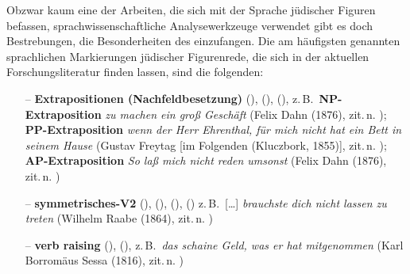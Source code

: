 Obzwar kaum eine der Arbeiten, die sich mit der Sprache jüdischer Figuren befassen, sprachwissenschaftliche Analysewerkzeuge verwendet gibt es doch Bestrebungen, die Besonderheiten des \hai{{\LiJi}} einzufangen. Die am häufigsten genannten sprachlichen Markierungen jüdischer Figurenrede, die sich in der aktuellen Forschungsliteratur finden lassen, sind die folgenden:

\newpage 

\begin{itemize}

\item [–] \textbf{Extrapositionen  (Nachfeldbesetzung)}  (\citealt[104]{Richter1995}),  (\citealt[219]{Althaus1981}),   (\citealt[187]{Jenzsch1974}), z.\,B.\, \textbf{NP-Extraposition} \textit{zu machen ein groß Geschäft}  (Felix Dahn  (1876), zit.\,n. \citealt[104]{Richter1995}); \textbf{PP-Extraposition} \textit{wenn der Herr Ehrenthal, für mich nicht hat ein Bett in seinem Hause}  (Gustav Freytag  [im Folgenden  (Kluczbork, 1855)], zit.\,n. \citealt[220]{Althaus1981}); \textbf{AP-Extraposition} \textit{So laß mich nicht reden umsonst}  (Felix Dahn  (1876), zit.\,n. \citealt[104]{Richter1995})\label{bspform1} 
	
\item [–] \textbf{symmetrisches-V2}  (\citealt[100]{Richter1995}),  (\citealt[219]{Althaus1981}),  (\citealt[141]{Gubser1998}),  (\citealt[143]{Neubauer1994}) z.\,B.\, […] \textit{brauchste dich nicht lassen zu treten} (Wilhelm Raabe  (1864), zit.\,n. \citealt[100]{Richter1995})\label{bspform2} 

\item [–] \textbf{verb raising}  (\citealt[141]{Gubser1998}),  (\citealt[141]{Gubser1998}), z.\,B.\, \textit{das schaine Geld, was er hat mitgenommen}  (Karl Borromäus Sessa  (1816), zit.\,n. \citealt[141]{Gubser1998})\label{bspform1b} 
	

\end{itemize}
